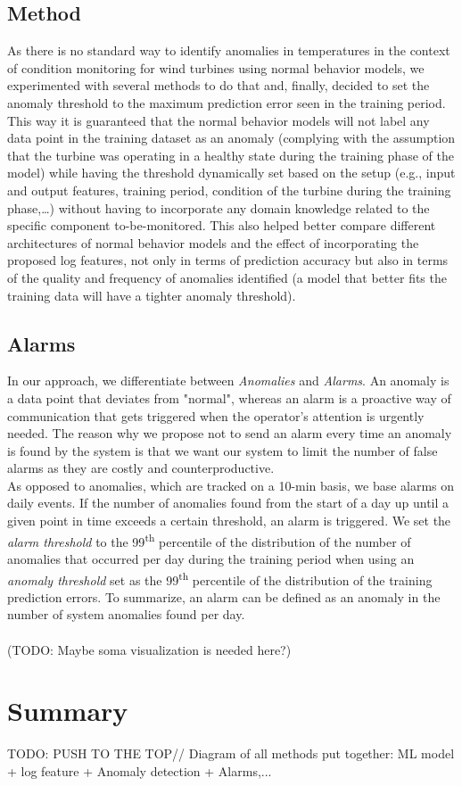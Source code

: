   \subsection{Method}
    As there is no standard way to identify anomalies in temperatures in the context of condition monitoring for wind turbines using normal behavior models, we experimented 
    with several methods to do that and, finally, decided to set the anomaly threshold to the maximum prediction error seen in the training period. This way it is 
    guaranteed that the normal behavior models will not label any data point in the training dataset as an anomaly (complying with the assumption that the turbine was operating 
    in a healthy state during the training phase of the model) while having the threshold dynamically set based on the setup (e.g., 
    input and output features, training period, condition of the turbine during the training phase,\dots) without having to incorporate any domain knowledge related to the 
    specific component to-be-monitored. This also helped better compare different architectures of normal behavior models and the effect of incorporating the proposed log features, 
    not only in terms of prediction accuracy but also in terms of the quality and frequency of anomalies identified (a model that better fits the training data will have a 
    tighter anomaly threshold).

  \subsection{Alarms}
    In our approach, we differentiate between \emph{Anomalies} and \emph{Alarms}. An anomaly is a data point that deviates from "normal", whereas an alarm is a proactive 
    way of communication that gets triggered when the operator's attention is urgently needed. The reason why we propose not to send an alarm every time an anomaly is 
    found by the system is that we want our system to limit the number of false alarms as they are costly and counterproductive.\\
    As opposed to anomalies, which are tracked on a 10-min basis, we base alarms on daily events. If the number of anomalies found from the start of a day up until a given 
    point in time exceeds a certain threshold, an alarm is triggered. We set the \emph{alarm threshold} to the 99\textsuperscript{th} percentile of the distribution of the number of 
    anomalies that occurred per day during the training period when using an \emph{anomaly threshold} set as the 99\textsuperscript{th} percentile of the distribution of the 
    training prediction errors. To summarize, an alarm can be defined as an anomaly in the number of system anomalies found per day.\\
    \\
    (TODO: Maybe soma visualization is needed here?)


\section{Summary}
TODO:
PUSH TO THE TOP//
Diagram of all methods put together: ML model + log feature + Anomaly detection + Alarms,...